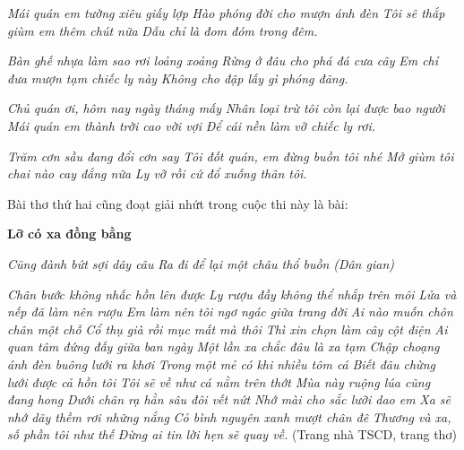\documentclass[../main.tex]{subfiles}
\begin{document}
\begin{multicols}{2}
\begin{blockquote}
\textit{Mái quán em tường xiêu giấy lợp}        
\textit{Hào phóng đời cho mượn ánh đèn}        
\textit{Tôi sẽ thắp giùm em thêm chút nữa} 
\textit{Dẫu chỉ là đom đóm trong đêm.} 
        
\textit{Bàn ghế nhựa làm sao rơi loảng xoảng}        
\textit{Rừng ở đâu cho phá đá cưa cây}        
\textit{Em chỉ đưa mượn tạm chiếc ly này} 
\textit{Không cho đập lấy gì phóng đãng.} 
        
\textit{Chủ quán ơi, hôm nay ngày tháng mấy}        
\textit{Nhân loại trừ tôi còn lại được bao người}        
\textit{Mái quán em thành trời cao vời vợi} 
\textit{Để cái nền làm vỡ chiếc ly rơi.} 
        
\textit{Trăm cơn sầu đang đổi cơn say}        
\textit{Tôi đốt quán, em đừng buồn tôi nhé}        
\textit{Mở giùm tôi chai nào cay đắng nữa} 
\textit{Ly vỡ rồi cứ đổ xuống thân tôi.} 

\end{blockquote}
 
Bài thơ thứ hai cũng đoạt giải nhứt trong cuộc thi này là bài: 
\begin{blockquote}
        
\textbf{Lỡ có xa đồng bằng} 
        
\textit{Cũng đành bứt sợi dây câu}        
\textit{Ra đi để lại một châu thổ buồn} 
\textit{(Dân gian)} 
        
\textit{Chân bước không nhấc hồn lên được}        
\textit{Ly rượu đầy không thể nhắp trên môi}        
\textit{Lửa và nếp đã làm nên rượu} 
\textit{Em làm nên tôi ngơ ngác giữa trang đời}        
\textit{         
Ai nào muốn chôn chân một chỗ}        
\textit{Cổ thụ già rồi mục mất mà thôi}        
\textit{Thì xin chọn làm cây cột điện} 
\textit{Ai quan tâm đứng đấy giữa ban ngày}        
\textit{         
Một lần xa chắc đâu là xa tạm}        
\textit{Chập choạng ánh đèn buông lưới ra khơi}        
\textit{Trong một mẻ có khi nhiều tôm cá} 
\textit{Biết đâu chừng lưới được cả hồn tôi}        
\textit{         
Tôi sẽ về như cá nằm trên thớt}        
\textit{Mùa này ruộng lúa cũng đang hong}        
\textit{Dưới chân rạ hằn sâu đôi vết nứt} 
\textit{Nhớ mài cho sắc lưỡi dao em}        
\textit{         
Xa sẽ nhớ dãy thềm rơi những nắng}        
\textit{Cỏ bình nguyên xanh mượt chân đê}        
\textit{Thương và xa, số phần tôi như thế}        
\textit{Đừng ai tin lời hẹn sẽ quay về.}        
(Trang nhà TSCD, trang thơ) 

\end{blockquote}
 

\end{multicols}
\end{document}
